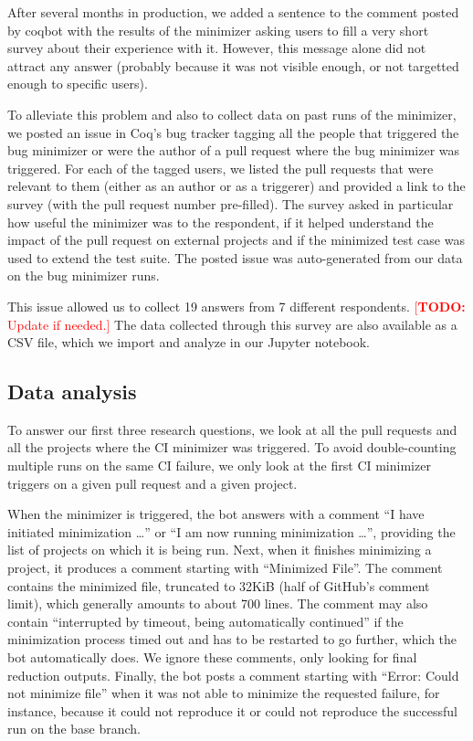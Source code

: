 \documentclass[a4paper,UKenglish,anonymous,cleveref,autoref,thm-restate]{lipics-v2021}
\makeatletter
\newcommand{\todo}[1]{%
\@latex@warning{TODO: \detokenize{#1} on page \thepage}%
\textcolor{red}{[\textbf{TODO:} #1]}}%
\makeatother
\begin{document}
After several months in production, we added a sentence to the comment posted by coqbot with the results of the minimizer asking users to fill a very short survey about their experience with it.
%
However, this message alone did not attract any answer (probably because it was not visible enough, or not targetted enough to specific users).

To alleviate this problem and also to collect data on past runs of the minimizer, we posted an issue in Coq's bug tracker tagging all the people that triggered the bug minimizer or were the author of a pull request where the bug minimizer was triggered.
%
For each of the tagged users, we listed the pull requests that were relevant to them (either as an author or as a triggerer) and provided a link to the survey (with the pull request number pre-filled).
%
The survey asked in particular how useful the minimizer was to the respondent, if it helped understand the impact of the pull request on external projects and if the minimized test case was used to extend the test suite.
%
The posted issue was auto-generated from our data on the bug minimizer runs.

This issue allowed us to collect 19 answers from 7 different respondents. \todo{Update if needed.}
%
The data collected through this survey are also available as a CSV file, which we import and analyze in our Jupyter notebook.

\subsection{Data analysis}

To answer our first three research questions, we look at all the pull requests and all the projects where the CI minimizer was triggered.
%
To avoid double-counting multiple runs on the same CI failure, we only look at the first CI minimizer triggers on a given pull request and a given project.

When the minimizer is triggered, the bot answers with a comment ``I have initiated minimization \ldots'' or ``I am now running minimization \ldots'', providing the list of projects on which it is being run.
%
Next, when it finishes minimizing a project, it produces a comment starting with ``Minimized File''.
%
The comment contains the minimized file, truncated to 32KiB (half of GitHub's comment limit), which generally amounts to about 700 lines.
%
The comment may also contain ``interrupted by timeout, being automatically continued'' if the minimization process timed out and has to be restarted to go further, which the bot automatically does.
%
We ignore these comments, only looking for final reduction outputs.
%
Finally, the bot posts a comment starting with ``Error: Could not minimize file'' when it was not able to minimize the requested failure, for instance, because it could not reproduce it or could not reproduce the successful run on the base branch.
\end{document}
